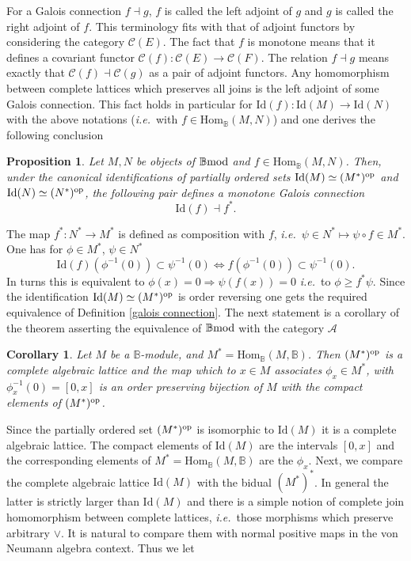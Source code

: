 \documentclass[12pt]{article}
\newtheorem{prop}[thm]{Proposition}
\newtheorem{cor}[thm]{Corollary}
\def\Hom{{\rm Hom}}
\def\id{{\rm id}}
\def\B{{\mathbb B}}
\def\cA{{\mathcal A}}
\def\cC{{\mathcal C}}
\newcommand{\ie}{{\it i.e.\/}\ }
\def\id{{\mbox{Id}}}
\def\Hom {{\mbox{Hom}}}
\def\bmod{{\rm \B mod}}
\begin{document}
For a Galois connection $f\dashv g$, $f$ is called the left adjoint of $g$ and $g$ is called the right adjoint of $f$. This terminology fits with  that of adjoint functors by considering the category $\cC(E)$.  The fact that $f$ is monotone means that it defines a covariant functor $\cC(f):\cC(E)\to \cC(F)$. The relation $f \dashv g$ means exactly that $\cC(f) \dashv \cC(g)$ as a pair of adjoint functors. 
Any homomorphism between complete lattices which preserves all joins  is the left adjoint of some Galois connection. This fact holds in particular for $\id(f):\id(M)\to \id(N)$ with the above notations (\ie with $f\in \Hom_\B(M,N)$) and one derives the following conclusion
\begin{prop}\label{galois connection1} Let $M,N$ be objects of $\bmod$ and $f\in \Hom_\B(M,N)$. Then, under the canonical identifications of partially ordered sets $\id(M)\simeq (M^*)^{\rm op}$ and $\id(N)\simeq (N^*)^{\rm op}$, the following pair defines a monotone Galois connection
$$
\id(f)\dashv f^*.
$$	
\end{prop}
\proof The map $f^*:N^*\to M^*$ is defined as composition with $f$, \ie $\psi\in N^*\mapsto \psi\circ f\in M^*$. One has for $\phi\in M^*$, $\psi\in N^*$
$$
\id(f)(\phi^{-1}(0))\subset \psi^{-1}(0)\iff f(\phi^{-1}(0))\subset \psi^{-1}(0).
$$
In turns this is equivalent to $\phi(x)=0 \Rightarrow \psi(f(x))=0$ \ie to $\phi \geq f^*\psi$. Since the identification $\id(M)\simeq (M^*)^{\rm op}$ is order reversing one gets the required equivalence of Definition \ref{galois connection}.\endproof 
The next statement is a corollary of  the theorem  asserting the equivalence of  $\bmod$ with the category $\cA$
\begin{cor}\label{galois connection2} Let $M$ be a $\B$-module, and $M^*=\Hom_\B(M,\B)$.
Then $(M^*)^{\rm op}$ is a complete algebraic lattice and the map which to $x\in M$ associates $\phi_x\in M^*$, with $\phi_x^{-1}(0)=[0,x]$ is an order preserving bijection of $M$ with the compact elements of $(M^*)^{\rm op}$.
\end{cor}
\proof Since the partially ordered set $(M^*)^{\rm op}$ is isomorphic to $\id(M)$ it is a complete algebraic lattice. The compact elements of $\id(M)$ are the intervals $[0,x]$ and the corresponding elements of $M^*=\Hom_\B(M,\B)$ are the $\phi_x$. \endproof 
Next, we compare the complete algebraic lattice $\id(M)$ with the bidual $(M^*)^*$. In general the latter is strictly larger than $\id(M)$ and there is a simple notion of complete join homomorphism between complete lattices, \ie  those morphisms which preserve arbitrary $\vee$. It is natural to compare them with normal positive maps in the von Neumann algebra context. Thus we let 
\end{document}
